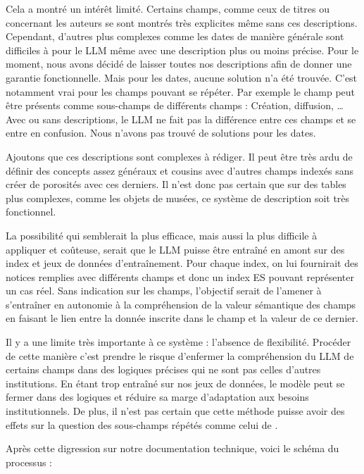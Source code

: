Cela a montré un intérêt limité. Certains champs, comme ceux de titres ou concernant les auteurs se sont montrés très explicites même sans ces descriptions. Cependant, d'autres plus complexes comme les dates de manière générale sont difficiles à  pour le \gls{LLM} même avec une description plus ou moins précise. Pour le moment, nous avons décidé de laisser toutes nos descriptions afin de donner une garantie fonctionnelle. Mais pour les dates, aucune solution n'a été trouvée. C'est notamment vrai pour les champs pouvant se répéter. Par exemple le champ  peut être présents comme sous-champs de différents champs : Création, diffusion, \dots Avec ou sans descriptions, le \gls{LLM} ne fait pas la différence entre ces champs et se entre en confusion. Nous n'avons pas trouvé de solutions pour les dates. 

Ajoutons que ces descriptions sont complexes à rédiger. Il peut être très ardu de définir des concepts assez généraux et cousins avec d'autres champs indexés sans créer de porosités avec ces derniers. Il n'est donc pas certain que sur des tables plus complexes, comme les objets de musées, ce système de description soit très fonctionnel. \newline

La possibilité qui semblerait la plus efficace, mais aussi la plus difficile à appliquer et coûteuse, serait que le \gls{LLM} puisse être entraîné en amont sur des index et jeux de données d'entraînement. Pour chaque index, on lui fournirait des notices remplies avec différents champs et donc un index \gls{ES} pouvant représenter un cas réel. Sans indication sur les champs, l'objectif serait de l'amener à s'entraîner en autonomie à la compréhension de la valeur sémantique des champs en faisant le lien entre la donnée inscrite dans le champ et la valeur de ce dernier. 

Il y a une limite très importante à ce système : l'absence de flexibilité. Procéder de cette manière c'est prendre le risque d'enfermer la compréhension du \gls{LLM} de certains champs dans des logiques précises qui ne sont pas celles d'autres institutions. En étant trop entraîné sur nos jeux de données, le modèle peut se fermer dans des logiques et réduire sa marge d'adaptation aux besoins institutionnels. De plus, il n'est pas certain que cette méthode puisse avoir des effets sur la question des sous-champs répétés comme celui de .\newline

Après cette digression sur notre documentation technique, voici le schéma du processus :

